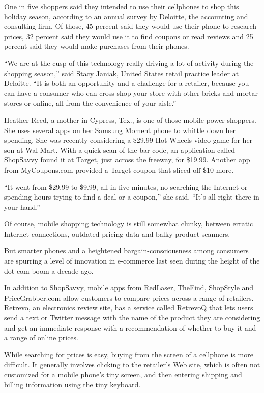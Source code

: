 ﻿\documentclass[12pt]{article}
\begin{document}
One in five shoppers said they intended to use their cellphones to shop this holiday season,
according to an annual survey by Deloitte, the accounting and consulting firm. Of those, 45 percent
said they would use their phone to research prices, 32 percent said they would use it to find
coupons or read reviews and 25 percent said they would make purchases from their phones.

``We are at the cusp of this technology really driving a lot of activity during the shopping
season,'' said Stacy Janiak, United States retail practice leader at Deloitte. ``It is both an
opportunity and a challenge for a retailer, because you can have a consumer who can cross-shop your
store with other bricks-and-mortar stores or online, all from the convenience of your aisle.''

Heather Reed, a mother in Cypress, Tex., is one of those mobile power-shoppers. She uses several
apps on her Samsung Moment phone to whittle down her spending. She was recently considering a
\$29.99 Hot Wheels video game for her son at Wal-Mart. With a quick scan of the bar code, an
application called ShopSavvy found it at Target, just across the freeway, for \$19.99. Another app
from MyCoupons.com provided a Target coupon that sliced off \$10 more.

``It went from \$29.99 to \$9.99, all in five minutes, no searching the Internet or spending hours
trying to find a deal or a coupon,'' she said. ``It's all right there in your hand.''

Of course, mobile shopping technology is still somewhat clunky, between erratic Internet
connections, outdated pricing data and balky product scanners.

But smarter phones and a heightened bargain-consciousness among consumers are spurring a level of
innovation in e-commerce last seen during the height of the dot-com boom a decade ago.

In addition to ShopSavvy, mobile apps from RedLaser, TheFind, ShopStyle and PriceGrabber.com allow
customers to compare prices across a range of retailers. Retrevo, an electronics review site, has a
service called RetrevoQ that lets users send a text or Twitter message with the name of the product
they are considering and get an immediate response with a recommendation of whether to buy it and a
range of online prices.

While searching for prices is easy, buying from the screen of a cellphone is more difficult. It
generally involves clicking to the retailer's Web site, which is often not customized for a mobile
phone's tiny screen, and then entering shipping and billing information using the tiny keyboard.
\end{document}
